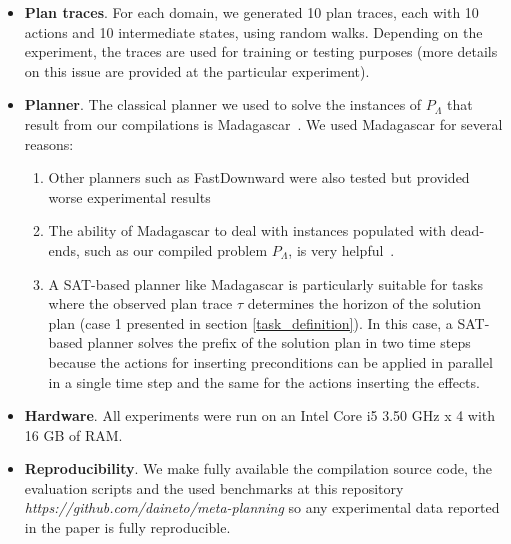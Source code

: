 \begin{itemize}
\item {\bf Plan traces}. For each domain, we generated 10 plan traces, each with 10 actions and 10 intermediate states, using random walks. Depending on the experiment, the traces are used for training or testing purposes (more details on this issue are provided at the particular experiment).

\item {\bf Planner}. The classical planner we used to solve the instances of $P_\Lambda$ that result from our compilations is {\sc Madagascar}~\cite{rintanen2014madagascar}. We used {\sc Madagascar} for several reasons:

  \begin{enumerate}
  \item Other planners such as {\sc FastDownward} were also tested but provided worse experimental results
  \item The ability of {\sc Madagascar} to deal with instances populated with dead-ends, such as our compiled problem $P_\Lambda$, is very helpful~\cite{lopez2015deterministic}.
  \item A SAT-based planner like {\sc Madagascar} is particularly suitable for tasks where the observed plan trace $\tau$ determines the horizon of the solution plan (case 1 presented in section \ref{task_definition}). In this case, a SAT-based planner solves the prefix of the solution plan in two time steps because the actions for inserting preconditions can be applied in parallel in a single time step and the same for the actions inserting the effects. 
  \end{enumerate}

\item {\bf Hardware}. All experiments were run on an Intel Core i5 3.50 GHz x 4 with 16 GB of RAM.

\item {\bf Reproducibility}. We make fully available the compilation source code, the evaluation scripts and the used benchmarks at this repository {\em https://github.com/daineto/meta-planning} so any experimental data reported in the paper is fully reproducible.
\end{itemize}

